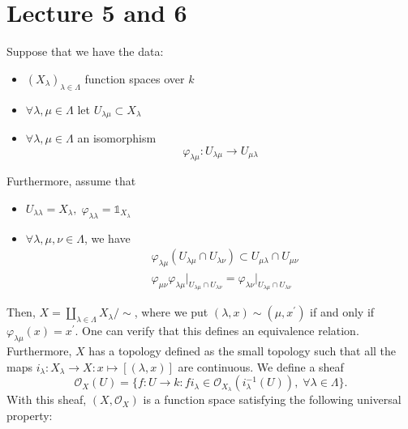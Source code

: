\section{Lecture 5 and 6}

\begin{dang}
    \begin{theorem}\label{theorem: glueing theorem}
        Suppose that we have the data:
\begin{itemize}
    \item $(X_\lambda)_{\lambda\in\Lambda}$ function spaces over $k$
    \item $\forall\lambda,\mu\in\Lambda$ let $U_{\lambda\mu}\subset X_\lambda$
    \item $\forall\lambda,\mu\in\Lambda$ an isomorphism
    \begin{equation}
        \varphi_{\lambda\mu}:U_{\lambda\mu}\rightarrow U_{\mu\lambda}
    \end{equation} 
\end{itemize}
Furthermore, assume that 
\begin{itemize}
    \item $U_{\lambda\lambda} = X_\lambda,\;\varphi_{\lambda\lambda} = \mathds{1}_{X_\lambda}$
    \item $\forall\lambda,\mu,\nu\in\Lambda$, we have 
    \begin{equation}
        \begin{split}
            &\varphi_{\lambda\mu}(U_{\lambda\mu}\cap U_{\lambda\nu})\subset U_{\mu\lambda}\cap U_{\mu\nu}\\
            &\varphi_{\mu\nu}\varphi_{\lambda\mu}\big|_{U_{\lambda\mu}\cap U_{\lambda\nu}}=\varphi_{\lambda\nu}\big|_{U_{\lambda\mu}\cap U_{\lambda\nu}}
        \end{split}
    \end{equation}
\end{itemize}
Then, $X=\coprod_{\lambda\in\Lambda}X_{\lambda}/\sim$, where we put $(\lambda,x)\sim (\mu,x^\prime)$ if and only if 
$\varphi_{\lambda\mu}(x)=x^\prime$. One can verify that this defines an equivalence relation. Furthermore, 
$X$ has a topology defined as the small topology such that all the maps $i_\lambda:X_\lambda\to X:x\mapsto [(\lambda,x)]$ 
are continuous. We define a sheaf 
\begin{equation}
    \mathcal{O}_X(U)=\{f:U\to k: fi_\lambda\in \mathcal{O}_{X_\lambda}(i_\lambda^{-1}(U)),\;\forall\lambda\in\Lambda\}.
\end{equation}
With this sheaf, $(X,\mathcal{O}_X)$ is a function space satisfying the following universal property: 

\end{theorem}
\end{dang}
